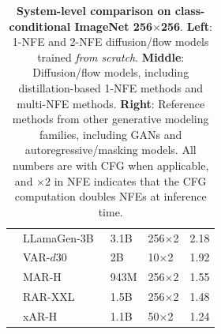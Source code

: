 \begin{table}[t]
{{\begin{tabular}{y{80}x{34}x{30}x{20}}
~~LLamaGen-3B~\cite{llamagen}      & 3.1B & 256$\times$2 & 2.18 \\
~~VAR-$d30$~\cite{var}               & 2B   & 10$\times$2 & 1.92 \\
~~MAR-H~\cite{mar}             & 943M & 256$\times$2 & 1.55 \\
~~RAR-XXL~\cite{rar}               & 1.5B & 256$\times$2 & 1.48\\
~~xAR-H~\cite{xar}                    & 1.1B & 50$\times$2 & 1.24 \\
\bottomrule
\end{tabular}%
}
}
\vspace{-.5em}
\caption{\textbf{System-level comparison on class-conditional ImageNet 256${\times}$256}.
\textbf{Left}: 1-NFE and 2-NFE diffusion/flow models trained \emph{from scratch}.
\textbf{Middle}: Diffusion/flow models, including distillation-based 1-NFE methods and multi-NFE methods.
\textbf{Right}: Reference methods from other generative modeling families, including GANs and autoregressive/masking models.
%
All numbers are with CFG when applicable, and $\times 2$ in NFE indicates that the CFG computation doubles NFEs at inference time.
}
\label{tab:all_results}
\vspace{-.25em}
\end{table}
